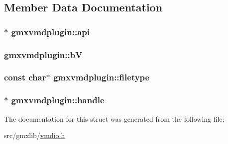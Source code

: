 \subsection{\-Member \-Data \-Documentation}
\hypertarget{structgmxvmdplugin_afc0674f586c2459d1b1a7da624a02acb}{
\subsubsection[{api}]{$\ast$ {\bf gmxvmdplugin\-::api}}}\label{structgmxvmdplugin_afc0674f586c2459d1b1a7da624a02acb}
\hypertarget{structgmxvmdplugin_a32d4d38e085027cdb7798a164c7fb578}{
\subsubsection[{b\-V}]{ {\bf gmxvmdplugin\-::b\-V}}}\label{structgmxvmdplugin_a32d4d38e085027cdb7798a164c7fb578}
\hypertarget{structgmxvmdplugin_acc8c82c77ab1b3c9cb4fc44e374520d7}{
\subsubsection[{filetype}]{\setlength{\rightskip}{0pt plus 5cm}const char$\ast$ {\bf gmxvmdplugin\-::filetype}}}\label{structgmxvmdplugin_acc8c82c77ab1b3c9cb4fc44e374520d7}
\hypertarget{structgmxvmdplugin_a3997458d3f662d9f0ea9ed2489609189}{
\subsubsection[{handle}]{$\ast$ {\bf gmxvmdplugin\-::handle}}}\label{structgmxvmdplugin_a3997458d3f662d9f0ea9ed2489609189}


\-The documentation for this struct was generated from the following file\-:\begin{DoxyCompactItemize}
\item 
src/gmxlib/\hyperlink{vmdio_8h}{vmdio.\-h}\end{DoxyCompactItemize}
